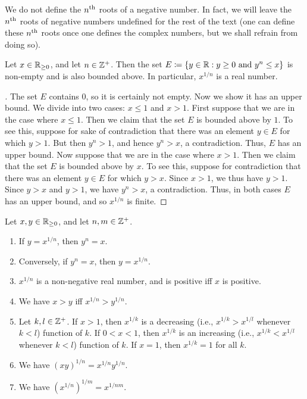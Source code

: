\begin{note}
  We do not define the \(n^{\operatorname{th}}\) roots of a negative number.
  In fact, we will leave the \(n^{\operatorname{th}}\) roots of negative numbers undefined for the rest of the text
  (one can define these \(n^{\operatorname{th}}\) roots once one defines the complex numbers, but we shall refrain from doing so).
\end{note}

\begin{lem}\label{i:5.6.5}
  Let \(x \in \mathbb{R}_{\geq 0}\), and let \(n \in \mathbb{Z}^+\).
  Then the set \(E \coloneqq \left\lbrace y \in \mathbb{R} : y \geq 0 \text{ and } y^n \leq x\right\rbrace\) is non-empty and is also bounded above.
  In particular, \(x^{1 / n}\) is a real number.
\end{lem}

\begin{proof}[]
  The set \(E\) contains \(0\), so it is certainly not empty.
  Now we show it has an upper bound.
  We divide into two cases: \(x \leq 1\) and \(x > 1\).
  First suppose that we are in the case where \(x \leq 1\).
  Then we claim that the set \(E\) is bounded above by \(1\).
  To see this, suppose for sake of contradiction that there was an element \(y \in E\) for which \(y > 1\).
  But then \(y^n > 1\), and hence \(y^n > x\), a contradiction.
  Thus, \(E\) has an upper bound.
  Now suppose that we are in the case where \(x > 1\).
  Then we claim that the set \(E\) is bounded above by \(x\).
  To see this, suppose for contradiction that there was an element \(y \in E\) for which \(y > x\).
  Since \(x > 1\), we thus have \(y > 1\).
  Since \(y > x\) and \(y > 1\), we have \(y^n > x\), a contradiction.
  Thus, in both cases \(E\) has an upper bound, and so \(x^{1 / n}\) is finite.
\end{proof}

\begin{lem}\label{i:5.6.6}
  Let \(x, y \in \mathbb{R}_{\geq 0}\), and let \(n, m \in \mathbb{Z}^+\).
  \begin{enumerate}
    \item If \(y = x^{1 / n}\), then \(y^n = x\).
    \item Conversely, if \(y^n = x\), then \(y = x^{1 / n}\).
    \item \(x^{1 / n}\) is a non-negative real number, and is positive iff \(x\) is positive.
    \item We have \(x > y\) iff \(x^{1 / n} > y^{1 / n}\).
    \item Let \(k, l \in \mathbb{Z}^+\).
          If \(x > 1\), then \(x^{1 / k}\) is a decreasing (i.e., \(x^{1 / k} > x^{1 / l}\) whenever \(k < l\)) function of \(k\).
          If \(0 < x < 1\), then \(x^{1 / k}\) is an increasing (i.e., \(x^{1 / k} < x^{1 / l}\) whenever \(k < l\)) function of \(k\).
          If \(x = 1\), then \(x^{1 / k} = 1\) for all \(k\).
    \item We have \((xy)^{1 / n} = x^{1 / n} y^{1 / n}\).
    \item We have \((x^{1 / n})^{1 / m} = x^{1 / nm}\).
  \end{enumerate}
\end{lem}

